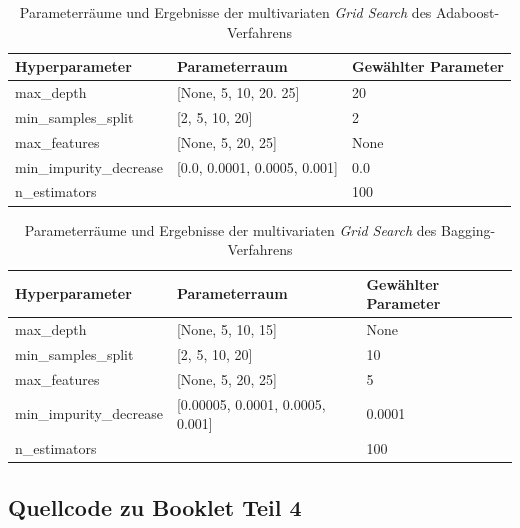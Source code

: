 \begin{table}[]
	\centering
	\begin{tabular}{lll}
	\hline
	Hyperparameter          & Parameterraum                        & Gewählter Parameter \\ \hline
	max\_depth              & {[}None, 5, 10, 20. 25{]}                & 20                   \\
	min\_samples\_split     & {[}2, 5, 10, 20{]}                   & 2                  \\
	max\_features           & {[}None, 5, 20, 25{]}                & None                  \\
	min\_impurity\_decrease & {[}0.0, 0.0001, 0.0005, 0.001{]} & 0.0             \\ 
	n\_estimators &  & 100 \\ \hline
\end{tabular}
	\caption{\label{table:parameter_grid_multivariat_adaboost} Parameterräume und Ergebnisse der multivariaten \emph{Grid Search} des Adaboost-Verfahrens}
\end{table}

\begin{table}[]
	\centering
	\begin{tabular}{lll}
	\hline
	Hyperparameter          & Parameterraum                        & Gewählter Parameter \\ \hline
	max\_depth              & {[}None, 5, 10, 15{]}                & None                \\
	min\_samples\_split     & {[}2, 5, 10, 20{]}                   & 10                  \\
	max\_features           & {[}None, 5, 20, 25{]}                & 5                   \\
	min\_impurity\_decrease & {[}0.00005, 0.0001, 0.0005, 0.001{]} & 0.0001              \\ 
	n\_estimators &  & 100 \\ \hline
\end{tabular}
	\caption{\label{table:parameter_grid_multivariat_bagging} Parameterräume und Ergebnisse der multivariaten \emph{Grid Search} des Bagging-Verfahrens}
\end{table}



\pagebreak
\subsection{Quellcode zu Booklet Teil 4}